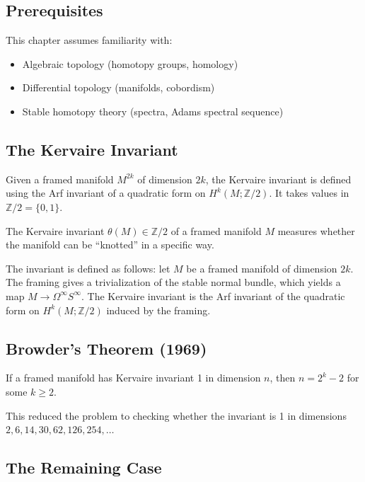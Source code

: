 \subsection{Prerequisites}
This chapter assumes familiarity with:
\begin{itemize}
\item Algebraic topology (homotopy groups, homology)
\item Differential topology (manifolds, cobordism)
\item Stable homotopy theory (spectra, Adams spectral sequence)
\end{itemize}

\subsection{The Kervaire Invariant}

Given a framed manifold $M^{2k}$ of dimension $2k$, the Kervaire invariant is defined using the Arf invariant of a quadratic form on $H^k(M; \mathbb{Z}/2)$. It takes values in $\mathbb{Z}/2 = \{0, 1\}$.

\begin{definition}
The Kervaire invariant $\theta(M) \in \mathbb{Z}/2$ of a framed manifold $M$ measures whether the manifold can be ``knotted'' in a specific way.
\end{definition}

The invariant is defined as follows: let $M$ be a framed manifold of dimension $2k$. The framing gives a trivialization of the stable normal bundle, which yields a map $M \to \Omega^\infty S^\infty$. The Kervaire invariant is the Arf invariant of the quadratic form on $H^k(M; \mathbb{Z}/2)$ induced by the framing.

\subsection{Browder's Theorem (1969)}

\begin{theorem}
If a framed manifold has Kervaire invariant 1 in dimension $n$, then $n = 2^k - 2$ for some $k \geq 2$.
\end{theorem}

This reduced the problem to checking whether the invariant is 1 in dimensions $2, 6, 14, 30, 62, 126, 254, \ldots$

\subsection{The Remaining Case}

